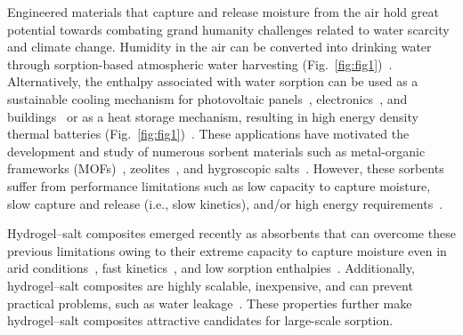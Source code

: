 \documentclass[11pt]{article}
\begin{document}
Engineered materials that capture and release moisture from the air hold great potential towards combating grand humanity challenges related to water scarcity and climate change. Humidity in the air can be converted into drinking water through sorption-based atmospheric water harvesting (Fig.~\ref{fig:fig1})~\cite{kim2017,kim2018}. Alternatively, the enthalpy associated with water sorption can be used as a sustainable cooling mechanism for photovoltaic panels~\cite{li2020}, electronics~\cite{zeng2023}, and buildings~\cite{cui2016} or as a heat storage mechanism, resulting in high energy density thermal batteries (Fig.~\ref{fig:fig1})~\cite{shan2023a,narayanan2015}. These applications have motivated the development and study of numerous sorbent materials such as metal-organic frameworks (MOFs)~\cite{liu2020,canivet2014,kim2017b}, zeolites~\cite{ng2008,castillo2013,simonot1979}, and hygroscopic salts~\cite{punwani2002,li2018,zhang2021}. However, these sorbents suffer from performance limitations such as low capacity to capture moisture, slow capture and release (i.e., slow kinetics), and/or high energy requirements~\cite{zhong2024}.

Hydrogel--salt composites emerged recently as absorbents that can overcome these previous limitations owing to their extreme capacity to capture moisture even in arid conditions~\cite{graeber2023,entezari2020,xu2021}, fast kinetics~\cite{xu2021,diazmarin2022a,guo2022}, and low sorption enthalpies~\cite{lu2022}. Additionally, hydrogel--salt composites are highly scalable, inexpensive, and can prevent practical problems, such as water leakage~\cite{graeber2023}. These properties further make hydrogel--salt composites attractive candidates for large-scale sorption.
\end{document}
